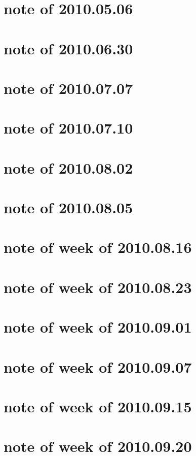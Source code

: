 \documentclass{article}
\begin{document}
\section{note of 2010.05.06}

\section{note of 2010.06.30}


\section{note of 2010.07.07}

\section{note of 2010.07.10}


\section{note of 2010.08.02}

\section{note of 2010.08.05}

\section{note of week of 2010.08.16}

\section{note of week of 2010.08.23}

\section{note of week of 2010.09.01}

\section{note of week of 2010.09.07}


\section{note of week of 2010.09.15}

\section{note of week of 2010.09.20}

\end{document}

